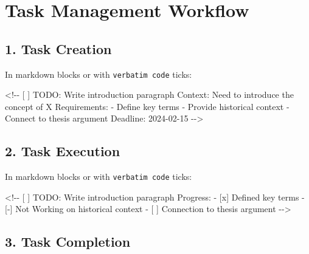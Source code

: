 \documentclass[
  11pt,
  letterpaper,
]{book}
\newenvironment{Shaded}{\begin{snugshade}}{\end{snugshade}}
\newcommand{\AlertTok}[1]{\textcolor[rgb]{0.68,0.00,0.00}{#1}}
\newcommand{\CommentTok}[1]{\textcolor[rgb]{0.37,0.37,0.37}{#1}}
\begin{document}
\section*{Task Management Workflow}\label{task-management-workflow}


\subsection*{1. Task Creation}\label{task-creation}

In markdown blocks or with \texttt{verbatim\ code} ticks:

\begin{Shaded}
\begin{Highlighting}[]
\CommentTok{\textless{}!{-}{-} [ ] }\AlertTok{TODO}\CommentTok{: Write introduction paragraph}
\CommentTok{  Context: Need to introduce the concept of X}
\CommentTok{  Requirements: }
\CommentTok{  {-} Define key terms}
\CommentTok{  {-} Provide historical context}
\CommentTok{  {-} Connect to thesis argument}
\CommentTok{  Deadline: 2024{-}02{-}15}
\CommentTok{{-}{-}\textgreater{}}
\end{Highlighting}
\end{Shaded}

\subsection*{2. Task Execution}\label{task-execution}

In markdown blocks or with \texttt{verbatim\ code} ticks:

\begin{Shaded}
\begin{Highlighting}[]
\CommentTok{\textless{}!{-}{-} [ ] }\AlertTok{TODO}\CommentTok{: Write introduction paragraph}
\CommentTok{  Progress:}
\CommentTok{  {-} [x] Defined key terms}
\CommentTok{  {-} [{-}] Not Working on historical context}
\CommentTok{  {-} [ ] Connection to thesis argument}
\CommentTok{{-}{-}\textgreater{}}
\end{Highlighting}
\end{Shaded}

\subsection*{3. Task Completion}\label{task-completion}
\end{document}
